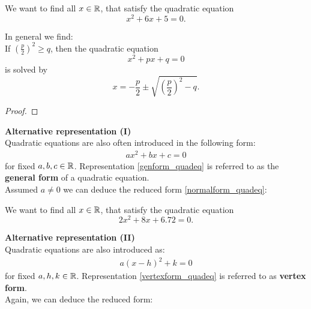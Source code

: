 \begin{frame} 
\begin{ex}
	We want to find all $x \in {\mathbb{R}}$, that satisfy the quadratic equation $$x^2 + 6x + 5 = 0 .$$
\end{ex}

 \end{frame}

\begin{frame} 
In general we find:\\[4pt]
{\color{satzrot} 
	If $\left(\frac{p}{2}\right)^2 \geq q$, then the quadratic equation
	$$  x^2 + px +q = 0 $$
	is solved by
	$$x = -\frac{p}{2} \pm \sqrt{ \left(\frac{p}{2}\right)^2 - q}.$$
}
\begin{proof}
	\blank
\end{proof}
 \end{frame}


\begin{frame} 
\textbf{Alternative representation (I)}\\[6pt]
Quadratic equations are also often introduced in the following form:
\begin{align} \label{genform_quadeq}
ax^2 + bx + c = 0 
\end{align}
for fixed $a,b,c \in {\mathbb{R}}$. Representation \eqref{genform_quadeq} is referred to as the {\color{defgruen} \textbf{general form}} of a quadratic equation.\\[5pt]
Assumed $a \neq 0$ we can deduce the reduced form \eqref{normalform_quadeq}:

 \end{frame}

\begin{frame} 
\begin{ex}
	We want to find all $x \in {\mathbb{R}}$, that satisfy the quadratic equation $$2x^2 + 8x + 6.72 = 0 .$$
\end{ex}
 \end{frame}


\begin{frame} 
\textbf{Alternative representation (II)}\\[6pt]
Quadratic equations are also introduced as:
\begin{align} \label{vertexform_quadeq}
a(x-h)^2 + k = 0 
\end{align}
for fixed $a,h,k \in {\mathbb{R}}$. Representation \eqref{vertexform_quadeq} is referred to as {\color{defgruen} \textbf{vertex form}}.\\[5pt]
Again, we can deduce the reduced form:
 \end{frame}





